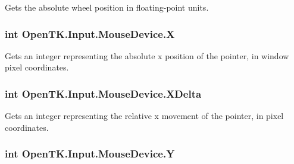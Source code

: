 Gets the absolute wheel position in floating-\/point units. 

\hypertarget{class_open_t_k_1_1_input_1_1_mouse_device_afc266b67cf1809bb2d27d231ae5d2dd5}{
\subsubsection[{X}]{\setlength{\rightskip}{0pt plus 5cm}int Open\-T\-K.\-Input.\-Mouse\-Device.\-X\hspace{0.3cm}{\ttfamily [get]}}}\label{class_open_t_k_1_1_input_1_1_mouse_device_afc266b67cf1809bb2d27d231ae5d2dd5}


Gets an integer representing the absolute x position of the pointer, in window pixel coordinates. 

\hypertarget{class_open_t_k_1_1_input_1_1_mouse_device_a4f6d5b4e04871884c0b20c0b005b5336}{
\subsubsection[{X\-Delta}]{\setlength{\rightskip}{0pt plus 5cm}int Open\-T\-K.\-Input.\-Mouse\-Device.\-X\-Delta\hspace{0.3cm}{\ttfamily [get]}}}\label{class_open_t_k_1_1_input_1_1_mouse_device_a4f6d5b4e04871884c0b20c0b005b5336}


Gets an integer representing the relative x movement of the pointer, in pixel coordinates. 

\hypertarget{class_open_t_k_1_1_input_1_1_mouse_device_aabbc4ab5371df1be49ad704927ff7e99}{
\subsubsection[{Y}]{\setlength{\rightskip}{0pt plus 5cm}int Open\-T\-K.\-Input.\-Mouse\-Device.\-Y\hspace{0.3cm}{\ttfamily [get]}}}\label{class_open_t_k_1_1_input_1_1_mouse_device_aabbc4ab5371df1be49ad704927ff7e99}


